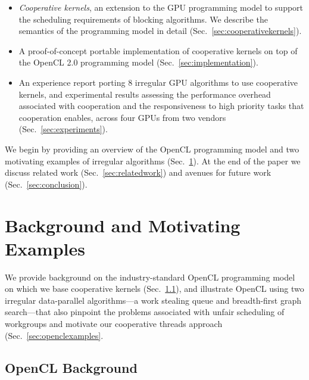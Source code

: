 \documentclass[numbers,nocopyrightspace,10pt]{sigplanconf}
\newcommand{\mysec}{Sec.~}
\newcommand{\NumAlgorithms}{8}
\begin{document}
\begin{itemize}

\item \emph{Cooperative kernels}, an extension to the GPU programming model to support the scheduling requirements of blocking algorithms.  We describe the semantics of the programming model in detail (\mysec\ref{sec:cooperativekernels}). 

\item A proof-of-concept portable implementation of cooperative
  kernels on top of the OpenCL 2.0 programming model
  (\mysec\ref{sec:implementation}).

\item An experience report porting \NumAlgorithms{} irregular GPU
  algorithms to use cooperative kernels, and experimental results
  assessing the performance overhead associated with cooperation and
  the responsiveness to high priority tasks that cooperation enables,
  across four GPUs from two vendors (\mysec\ref{sec:experiments}).

\end{itemize}

We begin by providing an overview of the OpenCL programming model and
two motivating examples of irregular algorithms (\mysec\ref{sec:background}).  At the end of the paper we discuss related work (\mysec\ref{sec:relatedwork}) and avenues for future work (\mysec\ref{sec:conclusion}).

\section{Background and Motivating Examples}\label{sec:background}

We provide background on the industry-standard OpenCL programming
model on which we base cooperative kernels (\mysec\ref{sec:opencl}),
and illustrate OpenCL using two irregular data-parallel algorithms---a
work stealing queue and breadth-first graph search---that also
pinpoint the problems associated with unfair scheduling of workgroups
and motivate our cooperative threads approach (\mysec\ref{sec:openclexamples}.

\subsection{OpenCL Background}\label{sec:opencl}

\end{document}
